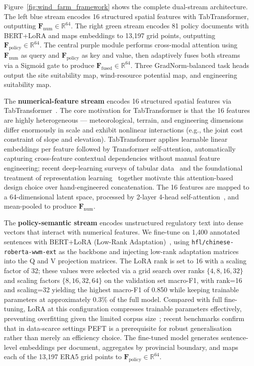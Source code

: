 \documentclass[12pt, a4paper]{article}
\begin{document}
Figure~\ref{fig:wind_farm_framework} shows the complete
dual-stream architecture. The left blue stream encodes 16
structured spatial features with TabTransformer, outputting
$\mathbf{F}_\text{num} \in \mathbb{R}^{64}$. The right green
stream encodes 81 policy documents with BERT+LoRA and maps
embeddings to 13,197 grid points, outputting
$\mathbf{F}_\text{policy} \in \mathbb{R}^{64}$. The central
purple module performs cross-modal attention using
$\mathbf{F}_\text{num}$ as query and
$\mathbf{F}_\text{policy}$ as key and value, then adaptively
fuses both streams via a Sigmoid gate to produce
$\mathbf{F}_\text{fused} \in \mathbb{R}^{64}$. Three
GradNorm-balanced task heads output the site suitability map,
wind-resource potential map, and engineering suitability map.

The \textbf{numerical-feature stream} encodes 16 structured
spatial features via TabTransformer~\cite{huang2020tabtransformer}.
The core motivation for TabTransformer is that the 16 features
are highly heterogeneous --- meteorological, terrain, and
engineering dimensions differ enormously in scale and exhibit
nonlinear interactions (e.g., the joint cost constraint of
slope and elevation). TabTransformer applies learnable linear
embeddings per feature followed by Transformer self-attention,
automatically capturing cross-feature contextual dependencies
without manual feature engineering; recent deep-learning
surveys of tabular data~\cite{borisov2024,shwartz2022} and the
foundational treatment of representation learning~\cite{lecun2015}
together motivate this attention-based design choice over
hand-engineered concatenation. The 16 features are mapped
to a 64-dimensional latent space, processed by 2-layer
4-head self-attention~\cite{vaswani2017}, and mean-pooled to produce
$\mathbf{F}_\text{num}$.

\begin{sloppypar}
The \textbf{policy-semantic stream} encodes unstructured
regulatory text into dense vectors that interact with numerical
features. We fine-tune on 1,400 annotated sentences with
BERT+LoRA (Low-Rank Adaptation)~\cite{devlin2019,hu2022,liu2019roberta,cui2020chinesebert}, using
\texttt{hfl/chinese-roberta-wwm-ext} as the backbone and
injecting low-rank adaptation matrices into the Q and V
projection matrices. The LoRA rank is set to 16 with a scaling
factor of 32; these values were selected via a grid search
over ranks $\{4, 8, 16, 32\}$ and scaling factors
$\{8, 16, 32, 64\}$ on the validation set macro-F1, with
rank=16 and scaling=32 yielding the highest macro-F1 of 0.850
while keeping trainable parameters at approximately 0.3\% of
the full model. Compared with full fine-tuning, LoRA at this
configuration compresses trainable parameters effectively,
preventing overfitting given the limited corpus
size~\cite{peft2025lora}; recent benchmarks confirm that
in data-scarce settings PEFT is a prerequisite for robust
generalisation rather than merely an efficiency choice. The
fine-tuned model generates sentence-level embeddings per
document, aggregates by provincial boundary, and maps each
of the 13,197 ERA5 grid points to
$\mathbf{F}_\text{policy} \in \mathbb{R}^{64}$.
\end{sloppypar}
\end{document}
